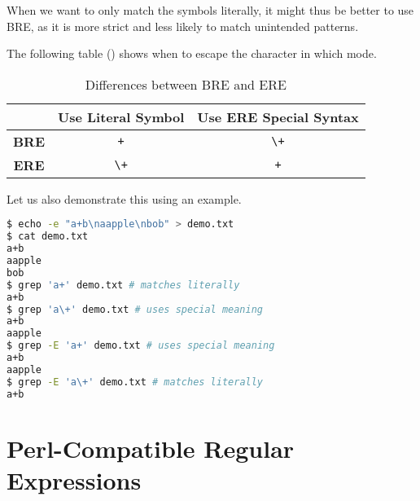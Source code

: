 When we want to only match the symbols literally, it might thus be better to use BRE, as it is more strict and less likely to match unintended patterns.

The following table () shows when to escape the character in which mode.

\begin{table}[h!]
  \caption{Differences between BRE and ERE}
  \centering
  \begin{tabular}{c c c}
     & \textbf{Use Literal Symbol} & \textbf{Use ERE Special Syntax} \\
    \midrule
    \textbf{BRE} & \lstinline|+| & \lstinline|\+| \\
    \textbf{ERE} & \lstinline|\+| & \lstinline|+| \\
  \end{tabular}
\end{table}

Let us also demonstrate this using an example.

\begin{lstlisting}[language=bash]
$ echo -e "a+b\naapple\nbob" > demo.txt
$ cat demo.txt
a+b
aapple
bob
$ grep 'a+' demo.txt # matches literally
a+b
$ grep 'a\+' demo.txt # uses special meaning
a+b
aapple
$ grep -E 'a+' demo.txt # uses special meaning
a+b
aapple
$ grep -E 'a\+' demo.txt # matches literally
a+b
\end{lstlisting}

\newpage
\section{Perl-Compatible Regular Expressions}

